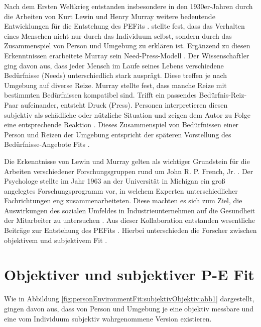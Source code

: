 Nach dem Ersten Weltkrieg entstanden insbesondere in den 1930er-Jahren durch die Arbeiten von Kurt Lewin und Henry Murray weitere bedeutende Entwicklungen für die Entstehung des \acp{PEFit} \cite[S. 1]{edwards:1990}\cite[S. 5]{caplan:1993}. \textcite[S. 11f.]{lewin:1936} stellte fest, dass das Verhalten eines Menschen nicht nur durch das Individuum selbst, sondern durch das Zusammenspiel von Person und Umgebung zu erklären ist. Ergänzend zu diesen Erkenntnissen erarbeitete Murray sein Need-Press-Modell \cite[S. 2]{edwards:2008}. Der Wissenschaftler ging davon aus, dass jeder Mensch im Laufe seines Lebens verschiedene Bedürfnisse (Needs) unterschiedlich stark ausprägt. Diese treffen je nach Umgebung auf diverse Reize. Murray stellte fest, dass manche Reize mit bestimmten Bedürfnissen kompatibel sind. Trifft ein passendes Bedürfnis-Reiz-Paar aufeinander, entsteht Druck (Press). Personen interpretieren diesen subjektiv als schädliche oder nützliche Situation und zeigen dem Autor zu Folge eine entsprechende Reaktion \cite[S. 38ff.]{murray:1938}. Dieses Zusammenspiel von Bedürfnissen einer Person und Reizen der Umgebung entspricht der späteren Vorstellung des Bedürfnisse-Angebote Fits \cite[S. 8]{edwards:2008}. 

Die Erkenntnisse von Lewin und Murray gelten als wichtiger Grundstein für die Arbeiten verschiedener Forschungsgruppen rund um John R. P. French, Jr. \cite[S. 5]{caplan:1993}. Der Psychologe stellte im Jahr 1963 an der Universität in Michigan ein groß angelegtes Forschungsprogramm vor, in welchem Experten unterschiedlicher Fachrichtungen eng zusammenarbeiteten. Diese machten es sich zum Ziel, die Auswirkungen des sozialen Umfeldes in Industrieunternehmen auf die Gesundheit der Mitarbeiter zu untersuchen \cite[S. 1ff.]{french:1963}. Aus dieser Kollaboration entstanden wesentliche Beiträge zur Entstehung des \acp{PEFit} \cite[S. 4ff.]{caplan:1993}. Hierbei unterschieden die Forscher zwischen objektivem und subjektivem Fit \cite[S. 4f.]{caplan:1993}\cite[S. 1ff.]{copingAndAdaption:1974}\cite[S. 1ff.]{french:1966}.

\section{Objektiver und subjektiver P-E Fit}
\label{ch:personEnvironmentFit:subjektivObjektiv}
Wie in Abbildung \ref{fig:personEnvironmentFit:subjektivObjektiv:abb1} dargestellt, gingen \textcite[S. 1ff.]{copingAndAdaption:1974} davon aus, dass von Person und Umgebung je eine objektiv messbare und eine vom Individuum subjektiv wahrgenommene Version existieren.

